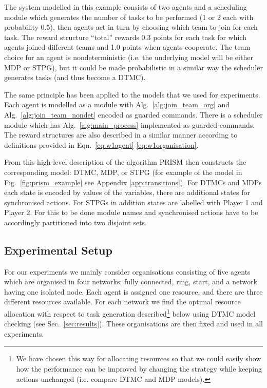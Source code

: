 \documentclass{llncs}
\begin{document}
The system modelled in this example consists of two agents and a scheduling module which generates the number of tasks to be performed (1 or 2 each with probability 0.5), then agents act in turn by choosing which team to join for each task. The reward structure ``total'' rewards 0.3 points for each task for which agents joined different teams and 1.0 points when agents cooperate. The team choice for an agent is nondeterministic (i.e. the underlying model will be either MDP or STPG), but it could be made probabilistic in a similar way the scheduler generates tasks (and thus become a DTMC).

The same principle has been applied to the models that we used for experiments. Each agent is modelled as a module with Alg.~\ref{alg:join_team_org} and Alg.~\ref{alg:join_team_nondet} encoded as guarded commands. There is a scheduler module which has Alg.~\ref{alg:main_process} implemented as guarded commands. The reward structures are also described in a similar manner according to definitions provided in Eqn.~\eqref{eq:w1agent}-\eqref{eq:w1organisation}.

From this high-level description of the algorithm PRISM then constructs the corresponding model: DTMC, MDP, or STPG (for example of the model in Fig.~\ref{fig:prism_example} see Appendix \ref{app:transitions}). For DTMCs and MDPs each state is encoded by values of the variables, there are additional states for synchronised actions. For STPGs in addition states are labelled with Player 1 and Player 2. For this to be done module names and synchronised actions have to be accordingly partitioned into two disjoint sets.

\subsection{Experimental Setup}
\label{subsec:exp_set}
For our experiments we mainly consider organisations consisting of five agents which are organised in four networks: fully connected, ring, start, and a network having one isolated node. Each agent is assigned one resource, and there are three different resources available. For each network we find the optimal resource allocation with respect to task generation described\footnote{We have chosen this way for allocating resources so that we could easily show how the performance can be improved by changing the strategy while keeping actions unchanged (i.e. compare DTMC and MDP models).} below using DTMC model checking (see Sec.~\ref{sec:results}). These organisations are then fixed and used in all experiments.
\end{document}
